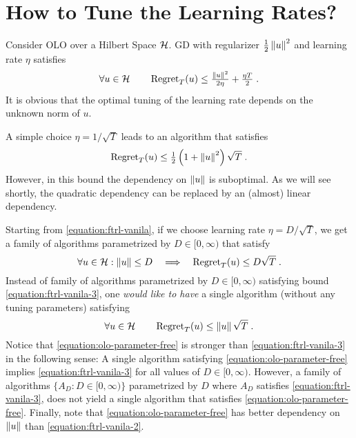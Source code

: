 \section{How to Tune the Learning Rates?}
\label{section:learning-rates}

Consider \ac{OLO} over a Hilbert Space $\mathcal{H}$. \ac{GD} with regularizer
$\tfrac{1}{2}\left\|{u}\right\|^2$ and learning rate $\eta$ satisfies~\citep{Shalev-Shwartz-2011}
\begin{equation}
\label{equation:ftrl-vanila}
\forall u \in \mathcal{H} \qquad \operatorname{Regret}_T(u) \le \tfrac{\left\|{u}\right\|^2}{2\eta} + \tfrac{\eta T}{2} \; .
\end{equation}
It is obvious that the optimal tuning of the learning rate depends on the
unknown norm of $u$.

A simple choice $\eta = 1/\sqrt{T}$ leads to an algorithm that satisfies
\begin{equation}
\label{equation:ftrl-vanila-2}
\operatorname{Regret}_T(u) \le \tfrac{1}{2}\left(1+\left\|{u}\right\|^2\right)\sqrt{T} \; .
\end{equation}
However, in this bound the dependency on $\left\|{u}\right\|$ is suboptimal. As we will
see shortly, the quadratic dependency can be replaced by an (almost) linear
dependency.

Starting from \eqref{equation:ftrl-vanila}, if we choose learning rate $\eta =
D/\sqrt{T}$, we get a family of algorithms parametrized by $D \in [0,\infty)$
that satisfy
\begin{equation}
\label{equation:ftrl-vanila-3}
\forall u \in \mathcal{H} : \left\|{u}\right\| \le D \quad  \Longrightarrow \quad \operatorname{Regret}_T(u) \le D \sqrt{T} \; .
\end{equation}
Instead of family of algorithms parametrized by $D \in [0,\infty)$ satisfying
bound \eqref{equation:ftrl-vanila-3}, one \emph{would like
to have} a single algorithm (without any tuning parameters) satisfying
\begin{equation}
\label{equation:olo-parameter-free}
\forall u \in \mathcal{H} \qquad \operatorname{Regret}_T(u) \le \left\|{u}\right\| \sqrt{T} \; .
\end{equation}
Notice that \eqref{equation:olo-parameter-free} is stronger than
\eqref{equation:ftrl-vanila-3} in the following sense: A single algorithm
satisfying \eqref{equation:olo-parameter-free} implies
\eqref{equation:ftrl-vanila-3} for all values of $D \in [0,\infty)$. However,
a family of algorithms $\{A_D : D \in [0,\infty)\}$ parametrized by $D$ where
$A_D$ satisfies \eqref{equation:ftrl-vanila-3}, does not yield a single
algorithm that satisfies \eqref{equation:olo-parameter-free}.  Finally, note
that \eqref{equation:olo-parameter-free} has better dependency on $\left\|{u}\right\|$
than \eqref{equation:ftrl-vanila-2}.

